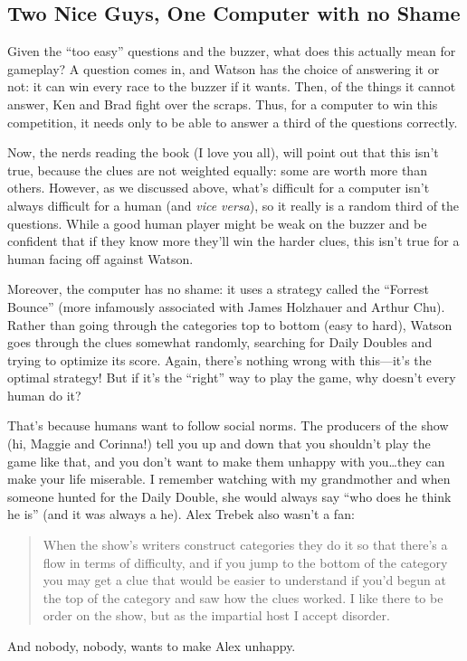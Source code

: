\subsection{Two Nice Guys, One Computer with no Shame}

Given the ``too easy'' questions and the buzzer, what does this actually mean for gameplay?  
%
A question comes in, and Watson has the choice of answering it or not: it can win every race to the buzzer if it wants.
%
Then, of the things it cannot answer, Ken and Brad fight over the scraps.
%
Thus, for a computer to win this competition, it needs only to be able to answer a third of the questions correctly.

Now, the \jeopardy{} nerds reading the book (I love you all), will point out that this isn't true, because the clues are not weighted equally: some are worth more than others.
%
However, as we discussed above, what's difficult for a computer isn't always difficult for a human (and \textit{vice versa}), so it really is a random third of the questions.
%
While a good human player might be weak on the buzzer and be confident that if they know more they'll win the harder clues, this isn't true for a human facing off against Watson.

Moreover, the computer has no shame: it uses a strategy called the ``Forrest Bounce'' (more infamously associated with James Holzhauer and Arthur Chu).
%
Rather than going through the categories top to bottom (easy to hard), Watson goes through the clues somewhat randomly, searching for Daily Doubles and trying to optimize its score.
%
Again, there's nothing wrong with this---it's the optimal strategy!
%
But if it's the ``right'' way to play the game, why doesn't every human do it?

That's because humans want to follow social norms.
%
The producers of the show (hi, Maggie and Corinna!) tell you up and down that you shouldn't play the game like that, and you don't want to make them unhappy with you\dots they can make your life miserable.
%
I remember watching \jeopardy{} with my grandmother and when someone hunted for the Daily Double, she would always say ``who does he think he is'' (and it was always a he).
%
Alex Trebek also wasn't a fan:
%
\begin{quote}
When the show's writers construct categories they do it so that there's a flow in terms of difficulty, and if you jump to the bottom of the category you may get a clue that would be easier to understand if you'd begun at the top of the category and saw how the clues worked. I like there to be order on the show, but as the impartial host I accept disorder.
\end{quote}
%
And nobody, nobody, wants to make Alex unhappy.


